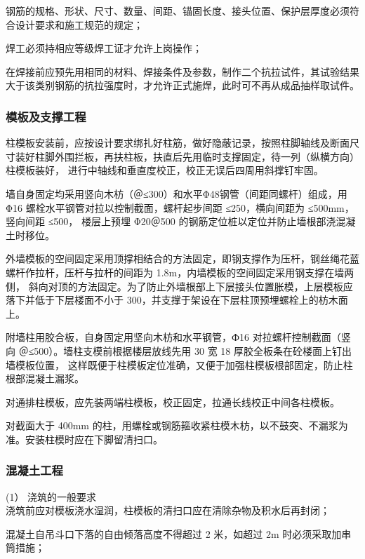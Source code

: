 钢筋的规格、形状、尺寸、数量、间距、锚固长度、接头位置、保护层厚度必须符合设计要求和施工规范的规定；

 焊工必须持相应等级焊工证才允许上岗操作；

 在焊接前应预先用相同的材料、焊接条件及参数，制作二个抗拉试件，其试验结果大于该类别钢筋的抗拉强度时，才允许正式施焊，此时可不再从成品抽样取试件。


\subsubsection{模板及支撑工程}

柱模板安装前，应按设计要求绑扎好柱筋，做好隐蔽记录，按照柱脚轴线及断面尺寸装好柱脚外围拦板，再扶柱板，扶直后先用临时支撑固定，待一列（纵横方向）柱模板装好，
进行中轴线和垂直度校正，校正无误后四周用斜撑钉牢固。

墙自身固定均采用竖向木枋（＠≤300）和水平Φ48钢管（间距同螺杆）组成，用 Φ16 螺栓水平钢管对拉以控制截面，螺杆起步间距 ≤250，横向间距为 ≤500mm，竖向间距 ≤500，
楼层上预埋 Φ20＠500 的钢筋定位桩以定位并防止墙根部浇混凝土时移位。

外墙模板的空间固定采用顶撑相结合的方法固定，即钢支撑作为压杆，钢丝绳花蓝螺杆作拉杆，压杆与拉杆的间距为 1.8m，内墙模板的空间固定采用钢支撑在墙两侧，
斜向对顶的方法固定。为了防止外墙根部上下层接头位置胀模，上层模板应落下并低于下层楼面不小于 300，并支撑于架设在下层柱顶预埋螺栓上的枋木面上。

附墙柱用胶合板，自身固定用坚向木枋和水平钢管，Ф16 对拉螺杆控制截面（竖向 ＠≤500）。墙柱支模前根据楼层放线先用 30 宽 18 厚胶全板条在砼楼面上钉出墙模板位置，
这样既便于柱模板定位准确，又便于加强柱模板根部固定，防止柱根部混凝土漏浆。

对通排柱模板，应先装两端柱模板，校正固定，拉通长线校正中间各柱模板。

对截面大于	400mm 的柱，用螺栓或钢筋箍收紧柱模木枋，以不鼓突、不漏浆为准。安装柱模时应在下脚留清扫口。


\subsubsection{混凝土工程}

(1） 浇筑的一般要求\\

 浇筑前应对模板浇水湿润，柱模板的清扫口应在清除杂物及积水后再封闭；

 混凝土自吊斗口下落的自由倾落高度不得超过 2 米，如超过 2m 时必须采取加串筒措施；

